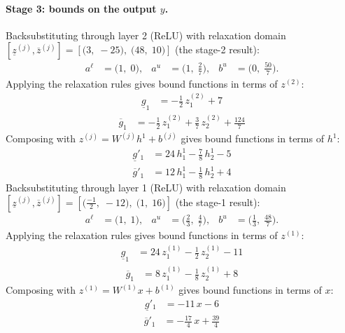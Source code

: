 \documentclass[11pt]{article}
\begin{document}
\paragraph{Stage 3: bounds on the output $y$.}
Backsubstituting through layer 2 (ReLU) with relaxation domain $[\underline{z}^{(j)}, \overline{z}^{(j)}] = [\bigl(3,\; -25\bigr),\; \bigl(48,\; 10\bigr)]$ (the stage-2 result):
\begin{align*}
a^{\ell} &= \bigl(1,\; 0\bigr), & a^{u} &= \bigl(1,\; \frac{2}{7}\bigr), & b^{u} &= \bigl(0,\; \frac{50}{7}\bigr).
\end{align*}
Applying the relaxation rules gives bound functions in terms of $z^{(2)}$:
\begin{align*}
\underline{g}_{1} &= -\frac{1}{2}\,z^{(2)}_{1} + 7
\end{align*}
\begin{align*}
\overline{g}_{1} &= -\frac{1}{2}\,z^{(2)}_{1} + \frac{3}{7}\,z^{(2)}_{2} + \frac{124}{7}
\end{align*}
Composing with $z^{(j)} = W^{(j)} h^{1} + b^{(j)}$ gives bound functions in terms of $h^{1}$:
\begin{align*}
\underline{g}'_{1} &= 24\,h^{1}_{1} - \frac{7}{8}\,h^{1}_{2} - 5
\end{align*}
\begin{align*}
\overline{g}'_{1} &= 12\,h^{1}_{1} - \frac{1}{8}\,h^{1}_{2} + 4
\end{align*}
Backsubstituting through layer 1 (ReLU) with relaxation domain $[\underline{z}^{(j)}, \overline{z}^{(j)}] = [\bigl(\frac{-1}{2},\; -12\bigr),\; \bigl(1,\; 16\bigr)]$ (the stage-1 result):
\begin{align*}
a^{\ell} &= \bigl(1,\; 1\bigr), & a^{u} &= \bigl(\frac{2}{3},\; \frac{4}{7}\bigr), & b^{u} &= \bigl(\frac{1}{3},\; \frac{48}{7}\bigr).
\end{align*}
Applying the relaxation rules gives bound functions in terms of $z^{(1)}$:
\begin{align*}
\underline{g}_{1} &= 24\,z^{(1)}_{1} - \frac{1}{2}\,z^{(1)}_{2} - 11
\end{align*}
\begin{align*}
\overline{g}_{1} &= 8\,z^{(1)}_{1} - \frac{1}{8}\,z^{(1)}_{2} + 8
\end{align*}
Composing with $z^{(1)} = W^{(1)} x + b^{(1)}$ gives bound functions in terms of $x$:
\begin{align*}
\underline{g}'_{1} &= -11\,x - 6
\end{align*}
\begin{align*}
\overline{g}'_{1} &= -\frac{17}{4}\,x + \frac{39}{4}
\end{align*}
\end{document}
